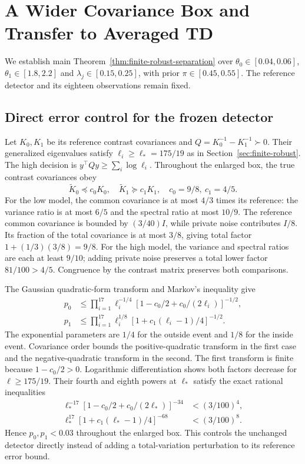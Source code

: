 \section{A Wider Covariance Box and Transfer to Averaged TD}
\label{sec:td-extension}
We establish main Theorem~\ref{thm:finite-robust-separation} over $\theta_0\in[0.04,0.06]$, $\theta_1\in[1.8,2.2]$ and $\lambda_j\in[0.15,0.25]$, with prior $\pi\in[0.45,0.55]$.
The reference detector and its eighteen observations remain fixed.

\subsection{Direct error control for the frozen detector}
Let $K_0,K_1$ be its reference contrast covariances and $Q=K_0^{-1}-K_1^{-1}\succ0$.
Their generalized eigenvalues satisfy $\ell_i\ge\ell_*=175/19$ as in Section~\ref{sec:finite-robust}.
The high decision is $y^\top Qy\ge\sum_i\log\ell_i$.
Throughout the enlarged box, the true contrast covariances obey
\[
\widetilde K_0\preceq c_0K_0,\quad \widetilde K_1\succeq c_1K_1,
\quad c_0=9/8,\ c_1=4/5.
\]
For the low model, the common covariance is at most $4/3$ times its reference: the variance ratio is at most $6/5$ and the spectral ratio at most $10/9$.
The reference common covariance is bounded by $(3/40)I$, while private noise contributes $I/8$.
Its fraction of the total covariance is at most $3/8$, giving total factor $1+(1/3)(3/8)=9/8$.
For the high model, the variance and spectral ratios are each at least $9/10$; adding private noise preserves a total lower factor $81/100>4/5$.
Congruence by the contrast matrix preserves both comparisons.

The Gaussian quadratic-form transform and Markov's inequality give
\begin{align*}
p_0&\le\prod_{i=1}^{17}\ell_i^{-1/4}[1-c_0/2+c_0/(2\ell_i)]^{-1/2},\\
p_1&\le\prod_{i=1}^{17}\ell_i^{1/8}[1+c_1(\ell_i-1)/4]^{-1/2}.
\end{align*}
The exponential parameters are $1/4$ for the outside event and $1/8$ for the inside event.
Covariance order bounds the positive-quadratic transform in the first case and the negative-quadratic transform in the second.
The first transform is finite because $1-c_0/2>0$.
Logarithmic differentiation shows both factors decrease for $\ell\ge175/19$.
Their fourth and eighth powers at $\ell_*$ satisfy the exact rational inequalities
\begin{align*}
\ell_*^{-17}[1-c_0/2+c_0/(2\ell_*)]^{-34}&<(3/100)^4,\\
\ell_*^{17}[1+c_1(\ell_*-1)/4]^{-68}&<(3/100)^8.
\end{align*}
Hence $p_0,p_1<0.03$ throughout the enlarged box.
This controls the unchanged detector directly instead of adding a total-variation perturbation to its reference error bound.

